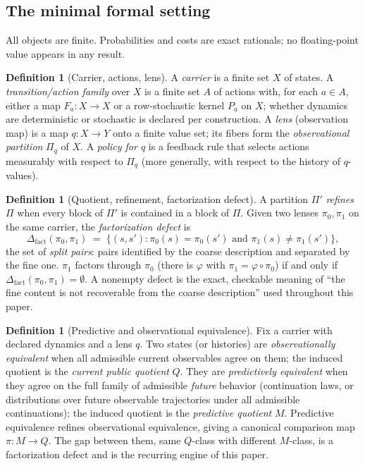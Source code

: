 \documentclass[11pt]{article}
\newcommand{\Dfact}{\Delta_{\mathrm{fact}}}
\theoremstyle{definition}
\newtheorem{definition}[theorem]{Definition}
\begin{document}
\subsection{The minimal formal setting}
\label{sec:setting}

All objects are finite. Probabilities and costs are exact rationals; no
floating-point value appears in any result.

\begin{definition}[Carrier, actions, lens]
A \emph{carrier} is a finite set $X$ of states. A \emph{transition/action
family} over $X$ is a finite set $A$ of actions with, for each $a\in A$,
either a map $F_a : X \to X$ or a row-stochastic kernel $P_a$ on $X$; whether
dynamics are deterministic or stochastic is declared per construction. A
\emph{lens} (observation map) is a map $q : X \to Y$ onto a finite value set;
its fibers form the \emph{observational partition} $\Pi_q$ of $X$. A
\emph{policy for $q$} is a feedback rule that selects actions measurably with
respect to $\Pi_q$ (more generally, with respect to the history of $q$-values).
\end{definition}

\begin{definition}[Quotient, refinement, factorization defect]
A partition $\Pi'$ \emph{refines} $\Pi$ when every block of $\Pi'$ is contained
in a block of $\Pi$. Given two lenses $\pi_0, \pi_1$ on the same carrier, the
\emph{factorization defect} is
\[
\Dfact(\pi_0,\pi_1) \;=\; \{(s,s') : \pi_0(s)=\pi_0(s') \text{ and }
\pi_1(s)\neq\pi_1(s')\},
\]
the set of \emph{split pairs}: pairs identified by the coarse description and
separated by the fine one. $\pi_1$ factors through $\pi_0$ (there is $\varphi$
with $\pi_1=\varphi\circ\pi_0$) if and only if $\Dfact(\pi_0,\pi_1)=\emptyset$.
A nonempty defect is the exact, checkable meaning of ``the fine content is not
recoverable from the coarse description'' used throughout this paper.
\end{definition}

\begin{definition}[Predictive and observational equivalence]
Fix a carrier with declared dynamics and a lens $q$. Two states (or histories)
are \emph{observationally equivalent} when all admissible current observables
agree on them; the induced quotient is the \emph{current public quotient} $Q$.
They are \emph{predictively equivalent} when they agree on the full family of
admissible \emph{future} behavior (continuation laws, or distributions over
future observable trajectories under all admissible continuations); the induced
quotient is the \emph{predictive quotient} $M$. Predictive equivalence refines
observational equivalence, giving a canonical comparison map $\pi : M \to Q$.
The gap between them, same $Q$-class with different $M$-class, is a
factorization defect and is the recurring engine of this paper.
\end{definition}
\end{document}

